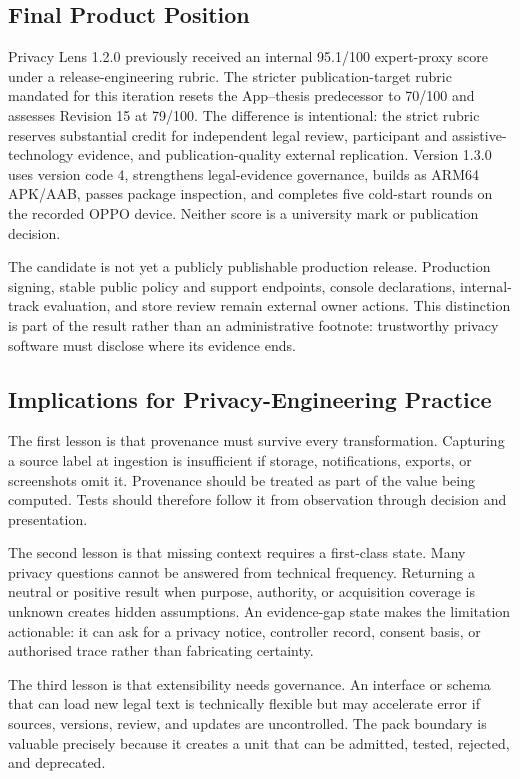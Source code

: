 \subsection{Final Product Position}

Privacy Lens 1.2.0 previously received an internal 95.1/100 expert-proxy score under a release-engineering rubric. The stricter publication-target rubric mandated for this iteration resets the App--thesis predecessor to 70/100 and assesses Revision 15 at 79/100. The difference is intentional: the strict rubric reserves substantial credit for independent legal review, participant and assistive-technology evidence, and publication-quality external replication. Version 1.3.0 uses version code 4, strengthens legal-evidence governance, builds as ARM64 APK/AAB, passes package inspection, and completes five cold-start rounds on the recorded OPPO device. Neither score is a university mark or publication decision.

The candidate is not yet a publicly publishable production release. Production signing, stable public policy and support endpoints, console declarations, internal-track evaluation, and store review remain external owner actions. This distinction is part of the result rather than an administrative footnote: trustworthy privacy software must disclose where its evidence ends.

\subsection{Implications for Privacy-Engineering Practice}

The first lesson is that provenance must survive every transformation. Capturing a source label at ingestion is insufficient if storage, notifications, exports, or screenshots omit it. Provenance should be treated as part of the value being computed. Tests should therefore follow it from observation through decision and presentation.

The second lesson is that missing context requires a first-class state. Many privacy questions cannot be answered from technical frequency. Returning a neutral or positive result when purpose, authority, or acquisition coverage is unknown creates hidden assumptions. An evidence-gap state makes the limitation actionable: it can ask for a privacy notice, controller record, consent basis, or authorised trace rather than fabricating certainty.

The third lesson is that extensibility needs governance. An interface or schema that can load new legal text is technically flexible but may accelerate error if sources, versions, review, and updates are uncontrolled. The pack boundary is valuable precisely because it creates a unit that can be admitted, tested, rejected, and deprecated.

